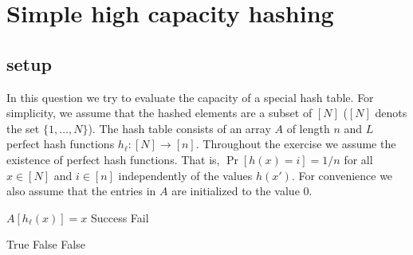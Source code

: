 \documentclass{article}
\begin{document}

\section{Simple high capacity hashing}
\subsection*{setup}
In this question we try to evaluate the capacity of a special hash table.
For simplicity, we assume that the hashed elements are a subset of $[N]$ ($[N]$ denots the set $\{1,\dots,N\}$).
The hash table consists of an array $A$ of length $n$ and $L$ perfect hash functions $h_\ell: [N] \rightarrow [n]$.
Throughout the exercise we assume the existence of perfect hash functions. That is, $\Pr[h(x) = i] = 1/n$ for all $x \in [N]$ and $i\in [n]$ 
independently of the values $h(x')$.  For convenience we also assume that the entries in $A$ are initialized to the value $0$.
%
\begin{algorithm}
\caption{$Add(x)$}
\begin{algorithmic}
\FOR {$\ell \in [L]$}
    	\STATE $A[h_\ell(x)] = x$
	\STATE \RETURN Success
    \ENDIF
\ENDFOR
\STATE \RETURN Fail
\end{algorithmic}
\end{algorithm}
%
\vspace{-.6cm}
\begin{algorithm}
\caption{$Query(x)$}
\begin{algorithmic}
\FOR {$\ell \in [L]$}
	\STATE \RETURN True
   	\STATE \RETURN False
    \ENDIF
\ENDFOR
\STATE \RETURN False
\end{algorithmic}
\end{algorithm}
%
\vspace{-.6cm}
\end{document}
